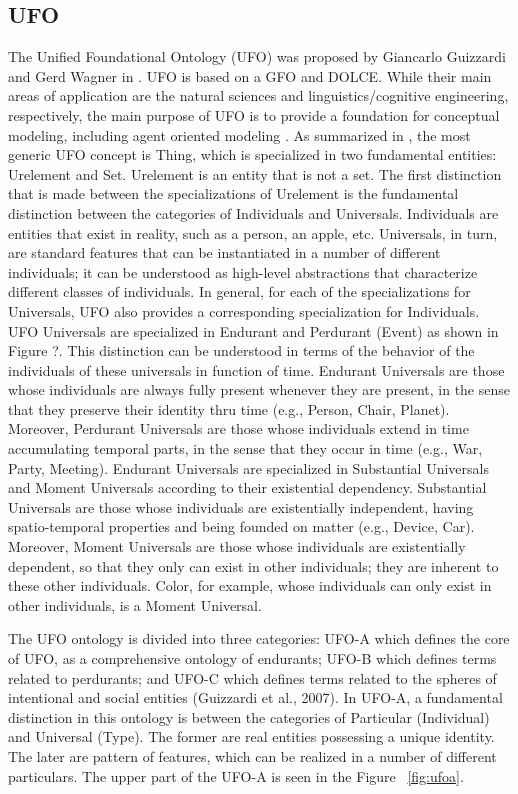 \subsection{UFO}
The Unified Foundational Ontology (UFO) was proposed by Giancarlo Guizzardi and Gerd Wagner in \cite{guizardi:2004}. UFO is based on a GFO and DOLCE. While their main areas of application are the natural sciences and linguistics/cognitive engineering, respectively, the main purpose of UFO is to provide a foundation for conceptual modeling, including agent oriented modeling \cite{guizardi:2005a}.
As summarized in \cite{carbonera:2012}, the most generic UFO concept is Thing, which is specialized in two fundamental entities: Urelement and Set. Urelement is an entity that is not a set. The first distinction that is made between the specializations of Urelement is the fundamental distinction between the categories of Individuals and Universals. Individuals are entities that exist in reality, such as a person, an apple, etc. Universals, in turn, are standard features that can be instantiated in a number of different individuals; it can be understood as high-level abstractions that characterize different classes of individuals. In general, for each of the specializations for Universals, UFO also provides a corresponding specialization for Individuals.
UFO Universals are specialized in Endurant and Perdurant (Event) as shown in Figure ?. This distinction can be understood in terms of the behavior of the individuals of these universals in function of time. Endurant Universals are those whose individuals are always fully present whenever they are present, in the sense that they preserve their identity thru time (e.g., Person, Chair, Planet). Moreover, Perdurant Universals are those whose individuals extend in time accumulating temporal parts, in the sense that they occur in time (e.g., War, Party, Meeting).
Endurant Universals are specialized in Substantial Universals and Moment Universals according to their existential dependency. Substantial Universals are those whose individuals are existentially independent, having spatio-temporal properties and being founded on matter (e.g., Device, Car). Moreover, Moment Universals are those whose individuals are existentially dependent, so that they only can exist in other individuals; they are inherent to these other individuals. Color, for example, whose individuals can only exist in other individuals, is a Moment Universal.

The UFO ontology is divided into three categories: UFO-A which defines the core of UFO, as a comprehensive ontology of endurants; UFO-B which defines terms related to perdurants; and UFO-C which defines terms related to the spheres of intentional and social entities \cite{keylist}(Guizzardi et al., 2007).
In UFO-A, a fundamental distinction in this ontology is between the categories of Particular (Individual) and Universal (Type). The former are real entities possessing a unique identity. The later are pattern of features, which can be realized in a number of different particulars. The upper part of the UFO-A is seen in the Figure ~\ref{fig:ufoa}.

